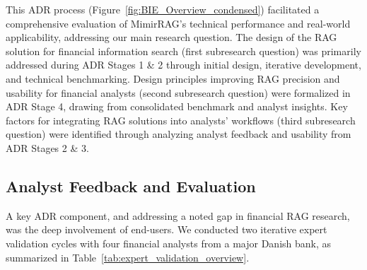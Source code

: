 \documentclass[final,5p,times,twopage,twocolumn,a4paper]{elsarticle}
\begin{document}
%
This ADR process (Figure~\ref{fig:BIE_Overview_condensed}) facilitated a comprehensive evaluation of MimirRAG's technical performance and real-world applicability, addressing our main research question. The design of the RAG solution for financial information search (first subresearch question) was primarily addressed during ADR Stages 1 \& 2 through initial design, iterative development, and technical benchmarking. Design principles improving RAG precision and usability for financial analysts (second subresearch question) were formalized in ADR Stage 4, drawing from consolidated benchmark and analyst insights. Key factors for integrating RAG solutions into analysts' workflows (third subresearch question) were identified through analyzing analyst feedback and usability from ADR Stages 2 \& 3.


\subsection{Analyst Feedback and Evaluation}
A key ADR component, and addressing a noted gap in financial RAG research, was the deep involvement of end-users. We conducted two iterative expert validation cycles with four financial analysts from a major Danish bank, as summarized in Table~\ref{tab:expert_validation_overview}.
\end{document}
